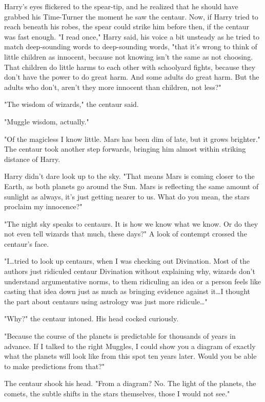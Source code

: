 Harry's eyes flickered to the spear-tip, and he realized that he should have
grabbed his Time-Turner the moment he saw the centaur. Now, if Harry tried to
reach beneath his robes, the spear could strike him before then, if the centaur
was fast enough. "I read once," Harry said, his voice a bit unsteady as he
tried to match deep-sounding words to deep-sounding words, "that it's wrong to
think of little children as innocent, because not knowing isn't the same as not
choosing. That children do little harms to each other with schoolyard fights,
because they don't have the power to do great harm. And some adults do great
harm. But the adults who don't, aren't they more innocent than children, not
less?"

"The wisdom of wizards," the centaur said.

"Muggle wisdom, actually."

"Of the magicless I know little. Mars has been dim of late, but it grows
brighter." The centaur took another step forwards, bringing him almost within
striking distance of Harry.

Harry didn't dare look up to the sky. "That means Mars is coming closer to the
Earth, as both planets go around the Sun. Mars is reflecting the same amount of
sunlight as always, it's just getting nearer to us. What do you mean, the stars
proclaim my innocence?"

"The night sky speaks to centaurs. It is how we know what we know. Or do they
not even tell wizards that much, these days?" A look of contempt crossed the
centaur's face.

"I…tried to look up centaurs, when I was checking out Divination. Most
of the authors just ridiculed centaur Divination without explaining why,
wizards don't understand argumentative norms, to them ridiculing an idea or a
person feels like casting that idea down just as much as bringing evidence
against it…I thought the part about centaurs using astrology was just
more ridicule…"

"Why?" the centaur intoned. His head cocked curiously.

"Because the course of the planets is predictable for thousands of years in
advance. If I talked to the right Muggles, I could show you a diagram of
exactly what the planets will look like from this spot ten years later. Would
you be able to make predictions from that?"

The centaur shook his head. "From a diagram? No. The light of the planets, the
comets, the subtle shifts in the stars themselves, those I would not see."

